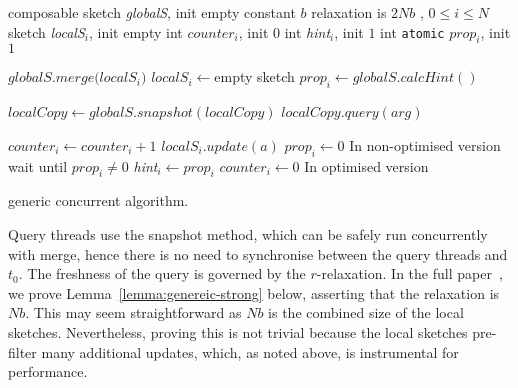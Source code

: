 \begin{algorithm}[htb]
    \small
    \begin{algorithmic}[1]
    \setcounter{ALG@line}{100}

    \Vars
    \State composable sketch \emph{globalS}, init empty
    \State constant $b$ \Comment relaxation is $2Nb$
     , $0 \leq i \leq N$
        \State sketch \emph{localS$_i$}\ingray{[$2$]}, init empty
        \State int $counter_i$, init $0$
        \State int \emph{hint}$_i$, init $1$
        \State int {\tt atomic} $prop_i$, init $1$
    \EndFor
    \EndFor

        \State $globalS.merge(localS_i$\ingray{[1-$cur_i$]}$)$ \label{l:merge}
        \State $localS_i$\ingray{[1-$cur_i$]}$ \leftarrow $empty sketch \label{l:emptyAux}
		\State $prop_i \leftarrow globalS.calcHint()$ \label{l:calcHint}
    \EndFor
    \EndWhile
    \EndProcedure


    \State $localCopy \leftarrow globalS.snapshot(localCopy)$
    \State \Return $localCopy.query(arg)$
    \EndProcedure
    
     \Return \label{l:shouldAdd}
    \EndIf
    \State $counter_i \leftarrow counter_i + 1$ \label{l:countup}
    \State $localS_i$\ingray{[$cur_i$]}$.update(a)$ \label{l:update}
     \label{l:checkfull}
    \State \underline{$prop_i \leftarrow 0$} \Comment In non-optimised version\label{l:signal}
    \State wait until $prop_i \neq 0$ \label{l:wait}
     \label{opt:l:swap-local-aux}
    \State \emph{hint}$_i \leftarrow prop_i$ \label{l:updateHint}
    \State $counter_i \leftarrow 0$ \label{l:zeroCounter}
     \Comment In optimised version\label{opt:l:signal}
    \EndIf
    \EndProcedure

    \end{algorithmic}
    \caption{ generic concurrent algorithm.}
    \label{alg:generic-concurrent}
\end{algorithm}

Query threads use the snapshot method, which can be safely run concurrently with merge,
hence there is no need to synchronise between the query threads and $t_0$. The freshness
of the query is governed by the $r$-relaxation.
In the full paper~\cite{rinberg2019fast},
we prove Lemma~\ref{lemma:genereic-strong} below, asserting that
the relaxation is $Nb$. This may seem straightforward as $Nb$ is the combined size of the
local sketches. Nevertheless, proving this is not trivial because the local sketches pre-filter
many additional updates, which, as noted above, is instrumental for performance. 

